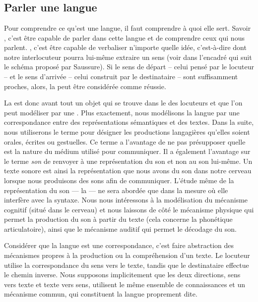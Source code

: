 \chapter{}\label{sec:1.1}

\section{Parler une langue}\label{sec:1.1.0}

Pour comprendre ce qu’est une langue, il faut comprendre à quoi elle sert. Savoir , c’est être capable de parler dans cette langue et de comprendre ceux qui nous parlent. , c’est être capable de verbaliser n’importe quelle idée, c’est-à-dire  dont notre interlocuteur pourra lui-même extraire un sens (voir dans l’encadré qui suit le schéma proposé par Saussure). Si le sens de départ – celui pensé par le locuteur – et le sens d’arrivée – celui construit par le destinataire – sont suffisamment proches, alors, la  peut être considérée comme réussie.

La  est donc avant tout un objet qui se trouve dans le  des locuteurs et que l’on peut modéliser par une . Plus exactement, nous modélisons la langue par une correspondance entre des représentations sémantiques et des textes. Dans la suite, nous utiliserons le terme  pour désigner les productions langagières qu’elles soient orales, écrites ou gestuelles. Ce terme a l’avantage de ne pas présupposer quelle est la nature du médium utilisé pour communiquer. Il a également l’avantage sur le terme \textit{son} de renvoyer à une représentation du son et non au son lui-même. Un texte sonore est ainsi la représentation que nous avons du son dans notre cerveau lorsque nous produisons des sons afin de communiquer. L’étude même de la représentation du son — la  — ne sera abordée que dans la mesure où elle interfère avec la syntaxe. Nous nous intéressons à la modélisation du mécanisme cognitif (situé dans le cerveau) et nous laissons de côté le mécanisme physique qui permet la production du son à partir du texte (cela concerne la phonétique articulatoire), ainsi que le mécanisme auditif qui permet le décodage du son.

Considérer que la langue est une correspondance, c’est faire abstraction des mécanismes propres à la production ou la compréhension d’un texte. Le locuteur utilise la correspondance du sens vers le texte, tandis que le destinataire effectue le chemin inverse. Nous supposons implicitement que les deux directions, sens vers texte et texte vers sens, utilisent le même ensemble de connaissances et un mécanisme commun, qui constituent la langue proprement dite.

